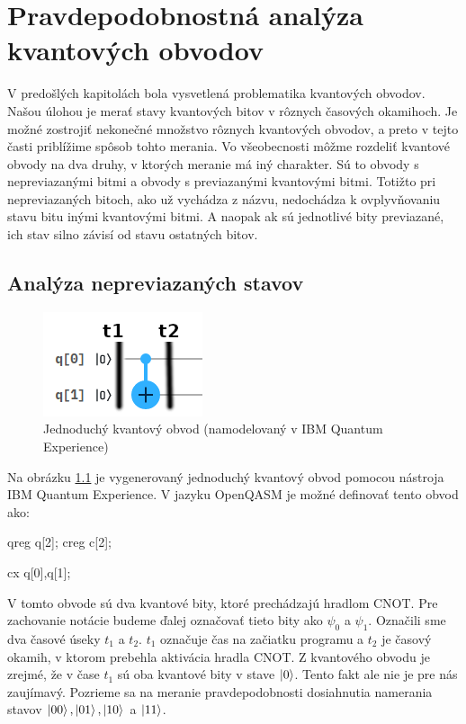 
\chapter{Pravdepodobnostná analýza kvantových obvodov}
\label{pravAnalL}

V predošlých kapitolách bola vysvetlená problematika kvantových obvodov.
Našou úlohou je merať stavy kvantových bitov v rôznych časových okamihoch.
Je možné zostrojiť nekonečné množstvo rôznych kvantových obvodov,
a preto v tejto časti priblížime spôsob tohto merania.
Vo všeobecnosti môžme rozdeliť kvantové obvody na dva druhy, v ktorých 
meranie má iný charakter. Sú to obvody s nepreviazanými bitmi a obvody s 
previazanými kvantovými bitmi. Totižto pri nepreviazaných bitoch,
ako už vychádza z názvu, nedochádza k ovplyvňovaniu stavu bitu inými 
kvantovými bitmi. A naopak ak sú jednotlivé bity previazané, ich stav silno
závisí od stavu ostatných bitov.

\section{Analýza nepreviazaných stavov}

\begin{figure} 
	\centering 
	\includegraphics[width=.4\textwidth]{figures/simpleCircuit2.png} 
	\caption{Jednoduchý kvantový obvod (namodelovaný v IBM Quantum Experience)}
    \label{obvod}
\end{figure}

Na obrázku \ref{obvod} je vygenerovaný jednoduchý kvantový obvod pomocou
nástroja IBM Quantum Experience. V jazyku OpenQASM je možné definovať tento
obvod ako:
\begin{code}
qreg q[2];
creg c[2];

cx q[0],q[1];
\end{code}

V tomto obvode sú dva kvantové bity, ktoré prechádzajú 
hradlom CNOT. Pre zachovanie notácie budeme ďalej označovať tieto bity ako 
\(\psi_0\) a \(\psi_1\). Označili sme dva časové úseky \(t_1\) a \(t_2\).
\(t_1\) označuje čas na začiatku programu a \(t_2\) je časový okamih, v ktorom
prebehla aktivácia hradla CNOT.
 Z kvantového obvodu je zrejmé, že v čase \(t_1\) 
sú oba kvantové bity v stave
\(\ket{0}\). Tento fakt ale nie je pre nás zaujímavý. Pozrieme sa na meranie 
pravdepodobnosti dosiahnutia  
namerania stavov \(\ket{00}, \ket{01}, \ket{10}\) a \(\ket{11}\).

